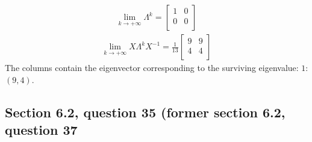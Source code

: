 \documentclass[a4paper,11pt]{article}
\begin{document}
\begin{align*}
\lim_{k \to +\infty} \Lambda^k
=
\begin{bmatrix}
1 & 0 \\
0 & 0 \\
\end{bmatrix}
\end{align*}
\begin{align*}
\lim_{k \to +\infty} X \Lambda^k X^{-1}
=
\frac{1}{13}
\begin{bmatrix}
9 & 9 \\
4 & 4 \\
\end{bmatrix}
\end{align*}
The columns contain the eigenvector corresponding to the surviving eigenvalue: $1$: $(9,4)$.
\subsection*{Section 6.2, question 35 (former section 6.2, question 37}
\end{document}
